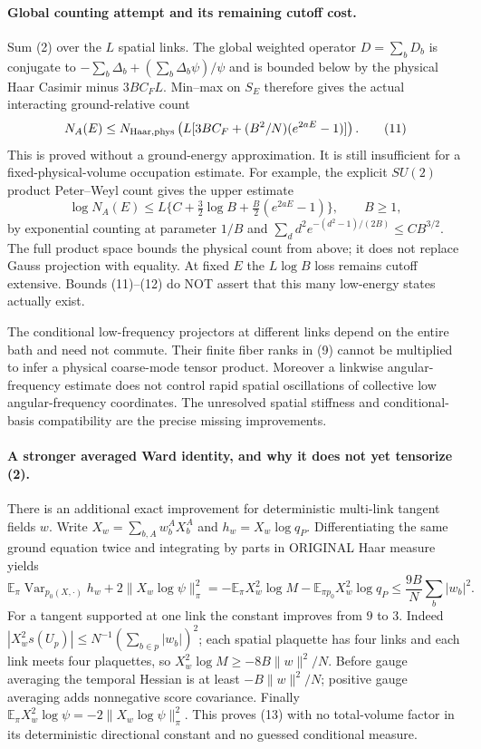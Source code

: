 \documentclass[11pt]{article}
\newcommand{\E}{\mathbb E}
\begin{document}
\paragraph{Global counting attempt and its remaining cutoff cost.}
Sum (2) over the $L$ spatial links. The global weighted operator
$D=\sum_bD_b$ is conjugate to
$-\sum_b\Delta_b+(\sum_b\Delta_b\psi)/\psi$
and is bounded below by the physical Haar Casimir minus $3BC_FL$.
Min--max on $S_E$ therefore gives the actual interacting ground-relative count
\[
 N_A(E)\le N_{\rm Haar,phys}
 \left(L[3BC_F+(B^2/N)(e^{2aE}-1)]\right).             \tag{11}
\]
This is proved without a ground-energy approximation. It is still insufficient
for a fixed-physical-volume occupation estimate. For example, the explicit
$SU(2)$ product Peter--Weyl count gives the upper estimate
\[
 \log N_A(E)\le L\{C+\tfrac32\log B
                      +\tfrac B2(e^{2aE}-1)\},\qquad B\ge1,    \tag{12}
\]
by exponential counting at parameter $1/B$ and
$\sum_d d^2e^{-(d^2-1)/(2B)}\le C B^{3/2}$.
The full product space bounds the physical count from above; it does not replace
Gauss projection with equality. At fixed $E$ the $L\log B$ loss remains cutoff
extensive. Bounds (11)--(12) do NOT assert that this many low-energy states
actually exist.

The conditional low-frequency projectors at different links depend on the
entire bath and need not commute. Their finite fiber ranks in (9) cannot be
multiplied to infer a physical coarse-mode tensor product. Moreover a linkwise
angular-frequency estimate does not control rapid spatial oscillations of
collective low angular-frequency coordinates. The unresolved spatial stiffness
and conditional-basis compatibility are the precise missing improvements.

\paragraph{A stronger averaged Ward identity, and why it does not yet tensorize (2).}
There is an additional exact improvement for deterministic multi-link tangent
fields $w$. Write $X_w=\sum_{b,A}w_b^A X_b^A$ and
$h_w=X_w\log q_P$. Differentiating the same ground equation twice and integrating
by parts in ORIGINAL Haar measure yields
\[
 \E_\pi\operatorname{Var}_{p_0(X,\cdot)}h_w
       +2\|X_w\log\psi\|_\pi^2
 =-\E_\pi X_w^2\log M
       -\E_{\pi p_0}X_w^2\log q_P
 \le\frac{9B}{N}\sum_b|w_b|^2.                        \tag{13}
\]
For a tangent supported at one link the constant improves from $9$ to $3$.
Indeed $|X_w^2s(U_p)|\le N^{-1}(\sum_{b\in p}|w_b|)^2$;
each spatial plaquette has four links and each link meets four plaquettes,
so $X_w^2\log M\ge-8B\|w\|^2/N$. Before gauge averaging the temporal
Hessian is at least $-B\|w\|^2/N$; positive gauge averaging adds nonnegative
score covariance. Finally $\E_\pi X_w^2\log\psi=-2\|X_w\log\psi\|_\pi^2$.
This proves (13) with no total-volume factor in its deterministic directional
constant and no guessed conditional measure.
\end{document}
